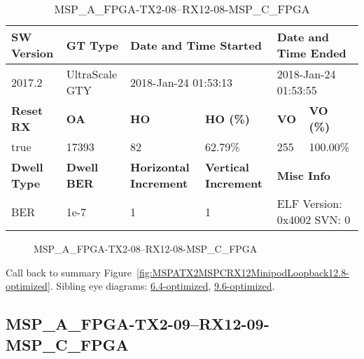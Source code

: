\begin{table}[h]
\centering
\caption{MSP\_A\_FPGA-TX2-08--RX12-08-MSP\_C\_FPGA}
\label{tab:MSPAFPGATX208RX1208MSPCFPGA12.8-optimized}
\begin{tabular}{@{}|l|l|l|l|l|l|@{}}
\toprule
\textbf{SW Version}                & \textbf{GT Type}   & \multicolumn{2}{l|}{\textbf{Date and Time Started}}            & \multicolumn{2}{l|}{\textbf{Date and Time Ended}}        \\ \midrule
2017.2                       & UltraScale GTY          & \multicolumn{2}{l|}{2018-Jan-24 01:53:13}                   & \multicolumn{2}{l|}{2018-Jan-24 01:53:55}               \\ \midrule
\textbf{Reset RX}                  & \textbf{OA} & \textbf{HO}   & \textbf{HO (\%)} & \textbf{VO} & \textbf{VO (\%)} \\ \midrule
true & 17393        & 82          & 62.79\%        & 255        & 100.00\%       \\ \midrule
\textbf{Dwell Type}                & \textbf{Dwell BER} & \textbf{Horizontal Increment} & \textbf{Vertical Increment}    & \multicolumn{2}{l|}{\textbf{Misc Info}}                  \\ \midrule
BER                            & 1e-7        & 1        & 1           & \multicolumn{2}{l|}{ELF Version: 0x4002 SVN: 0}                         \\ \bottomrule
\end{tabular}
\end{table}

\begin{figure}[h]
\caption{MSP\_A\_FPGA-TX2-08--RX12-08-MSP\_C\_FPGA} \label{fig:MSPAFPGATX208RX1208MSPCFPGA12.8-optimized}
\end{figure}

Call back to summary Figure~\ref{fig:MSPATX2MSPCRX12MinipodLoopback12.8-optimized}.
Sibling eye diagrams: \hyperref[sec:MSPAFPGATX208RX1208MSPCFPGA6.4-optimized]{6.4-optimized}, \hyperref[sec:MSPAFPGATX208RX1208MSPCFPGA9.6-optimized]{9.6-optimized}.

\clearpage
\newpage


\subsection{MSP\_A\_FPGA-TX2-09--RX12-09-MSP\_C\_FPGA}\label{sec:MSPAFPGATX209RX1209MSPCFPGA12.8-optimized}

